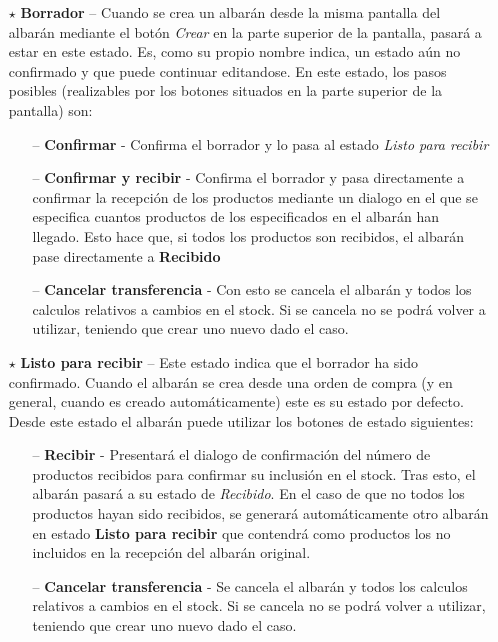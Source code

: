\begin{itemize}
\item[$\star$] \textbf{Borrador} -- Cuando se crea un albarán desde la misma pantalla del albarán mediante el botón \emph{Crear} en la parte superior de la pantalla, pasará a estar en este estado. Es, como su propio nombre indica, un estado aún no confirmado y que puede continuar editandose. En este estado, los pasos posibles (realizables por los botones situados en la parte superior de la pantalla) son:
  \begin{itemize}
  \item[--] \textbf{Confirmar} - Confirma el borrador y lo pasa al estado \emph{Listo para recibir}
  \item[--] \textbf{Confirmar y recibir} - Confirma el borrador y pasa directamente a confirmar la recepción de los productos mediante un dialogo en el que se especifica cuantos productos de los especificados en el albarán han llegado. Esto hace que, si todos los productos son recibidos, el albarán pase directamente a \textbf{Recibido}
  \item[--] \textbf{Cancelar transferencia} - Con esto se cancela el albarán y todos los calculos relativos a cambios en el stock. Si se cancela no se podrá volver a utilizar, teniendo que crear uno nuevo dado el caso.
  \end{itemize}


\item[$\star$] \textbf{Listo para recibir} -- Este estado indica que el borrador ha sido confirmado. Cuando el albarán se crea desde una orden de compra (y en general, cuando es creado automáticamente) este es su estado por defecto. Desde este estado el albarán puede utilizar los botones de estado siguientes:
  \begin{itemize}
  \item[--] \textbf{Recibir} - Presentará el dialogo de confirmación del número de productos recibidos para confirmar su inclusión en el stock. Tras esto, el albarán pasará a su estado de \emph{Recibido}. En el caso de que no todos los productos hayan sido recibidos, se generará automáticamente otro albarán en estado \textbf{Listo para recibir} que contendrá como productos los no incluidos en la recepción del albarán original.
  \item[--] \textbf{Cancelar transferencia} - Se cancela el albarán y todos los calculos relativos a cambios en el stock. Si se cancela no se podrá volver a utilizar, teniendo que crear uno nuevo dado el caso.
  \end{itemize}
  


\end{itemize}

